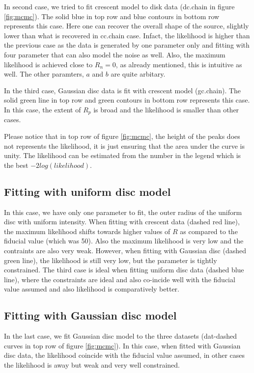 In second case, we tried to fit crescent model to disk data (dc.chain in figure \ref{fig:mcmc}). The solid blue in top row and blue contours in bottom row represents this case. Here one can recover the overall shape of the source, slightly lower than what is recovered in cc.chain case. Infact, the likelihood is higher than the previous case as the data is generated by one parameter only and fitting with four parameter that can also model the noise as well. Also, the maximum likelihood is achieved close to $R_n = 0$, as already mentioned, this is intuitive as well. The other paramters, $a$ and $b$ are quite arbitary. 

In the third case, Gaussian disc data is fit with crescent model (gc.chain). The solid green line in top row and green contours in bottom row represents this case. In this case, the extent of $R_p$ is broad and the likelihood is smaller than other cases.

Please notice that in top row of figure \ref{fig:mcmc}, the height of the peaks does not represents the likelihood, it is just ensuring that the area under the curve is unity. The likelihood can be estimated from the number in the legend which is the best $-2log(likelihood)$.

\subsection{Fitting with uniform disc model}
In this case, we have only one parameter to fit, the outer radius of the uniform disc with uniform intensity. When fitting with crescent data (dashed red line), the maximum likelihood shifts towards higher values of $R$ as compared to the fiducial value (which was 50). Also the maximum likelihood is very low and the contraints are also very weak. However, when fitting with Gaussian disc (dashed green line), the likelihood is still very low, but the parameter is tightly constrained. The third case is ideal when fitting uniform disc data (dashed blue line), where the constraints are ideal and also co-incide well with the fiducial value assumed and also likelihood is comparatively better. 


\subsection{Fitting with Gaussian disc model}
In the last case, we fit Gaussian disc model to the three datasets (dat-dashed curves in top row of figure \ref{fig:mcmc}). In this case, when fitted with Gaussian disc data, the likelihood coincide with the fiducial value assumed, in other cases the likelihood is away but weak and very well constrained. 


